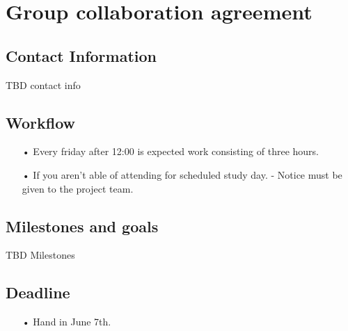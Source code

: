 \section{Group collaboration agreement}
\subsection{Contact Information}
TBD contact info

\subsection{Workflow}
\begin{enumerate}
	\item[•]Every friday after 12:00 is expected work consisting of three hours.   
	\item[•]If you aren’t able of attending for scheduled study day. - Notice must be given to the project team. 
\end{enumerate}

\subsection{Milestones and goals}
TBD Milestones

\subsection{Deadline}
\begin{enumerate}
	\item[•]Hand in June 7th.
\end{enumerate}
